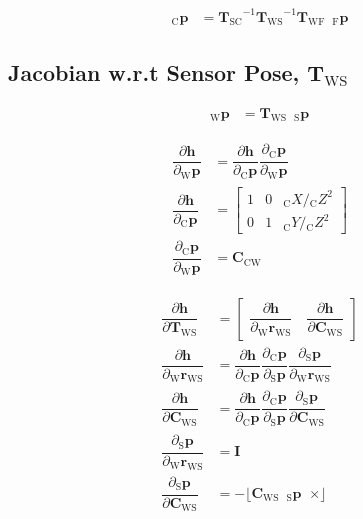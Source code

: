 \documentclass{article}
\renewcommand{\Vec}[1]{{\mathbf{#1}}}
\newcommand{\Mat}[1]{{\mathbf{#1}}}
\newcommand{\I}{{\Mat{I}}}
\newcommand{\Skew}[1]{{\lfloor #1 \enspace \times \rfloor}}
\newcommand{\tf}{\mathbf{T}}
\newcommand{\cam}{{\text{C}}}
\newcommand{\sensor}{{\text{S}}}
\newcommand{\world}{{\text{W}}}
\newcommand{\fiducial}{{\text{F}}}
\newcommand{\KineNotationTransform}[3]{{{#1}_{#2#3}}}
\newcommand{\KineNotation}[3]{{{{}_{#2}} {#1}_{#2#3}}}
\newcommand{\KineNotationPart}[3]{{{{}_{#2}} {#1}_{#3}}}
\newcommand{\KineNotationBare}[2]{{{{}_{#2}} {#1}}}
\newcommand{\pos}{{\Vec{r}}}
\newcommand{\Pos}[2]{{\KineNotation{\pos}{#1}{#2}}}
\newcommand{\rot}{{\Mat{C}}}
\newcommand{\Rot}[2]{{\KineNotationTransform{\rot}{#1}{#2}}}
\newcommand{\tf}{{\Mat{T}}}
\newcommand{\Tf}[2]{{\KineNotationTransform{\tf}{#1}{#2}}}
\newcommand{\point}{\Vec{p}}
\newcommand{\Pt}[1]{{\KineNotationPart{\point}{#1}{}}}
\newcommand{\Point}[2]{{\KineNotationBare{\point}{#1}}}
\newcommand{\projFunc}{{\Vec{h}}}
\begin{document}
\begin{align}
  \Point{\cam}{\fiducial_{ij}}
  &=
  \Tf{\sensor}{\cam}^{-1}
  \Tf{\world}{\sensor}^{-1}
  \Tf{\world}{\fiducial}
  \enspace \Point{\fiducial}{\fiducial_{ij}}
\end{align}


\subsection{Jacobian w.r.t Sensor Pose, $\Tf{\world}{\sensor}$}

\begin{align}
  \Point{\world}{\fiducial_{ij}}
  &=
    \Tf{\world}{\sensor}
    \enspace \Pt{\sensor}
\end{align}

\begin{align}
  \dfrac{\partial{\projFunc}}{\partial{\Pt{\world}}}
  &=
  \dfrac{\partial{\projFunc}}{\partial{\Pt{\cam}}}
  \dfrac{\partial{\Pt{\cam}}}{\partial{\Pt{\world}}} \\
  \dfrac{\partial{\projFunc}}{\partial{\Pt{\cam}}}
  &=
  \begin{bmatrix}
    1 & 0 & \KineNotationBare{X}{\cam} / \KineNotationBare{Z}{\cam}^{2} \\
    0 & 1 & \KineNotationBare{Y}{\cam} / \KineNotationBare{Z}{\cam}^{2}
  \end{bmatrix} \\
  \dfrac{\partial{\Pt{\cam}}}{\partial{\Pt{\world}}}
  &=
  \Rot{\cam}{\world}
\end{align}

\begin{align}
  \dfrac{\partial{\projFunc}}{\partial{\Tf{\world}{\sensor}}}
    &=
  \begin{bmatrix}
    \dfrac{\partial{\projFunc}}{\partial{\Pos{\world}{\sensor}}}
    \quad
    \dfrac{\partial{\projFunc}}{\partial{\Rot{\world}{\sensor}}}
  \end{bmatrix} \\
  \dfrac{\partial{\projFunc}}{\partial{\Pos{\world}{\sensor}}}
    &=
      \dfrac{\partial{\projFunc}}{\partial{\Pt{\cam}}}
      \dfrac{\partial{\Pt{\cam}}}{\partial{\Pt{\sensor}}}
      \dfrac{\partial{\Pt{\sensor}}}{\partial{\Pos{\world}{\sensor}}} \\
  \dfrac{\partial{\projFunc}}{\partial{\Rot{\world}{\sensor}}}
    &=
      \dfrac{\partial{\projFunc}}{\partial{\Pt{\cam}}}
      \dfrac{\partial{\Pt{\cam}}}{\partial{\Pt{\sensor}}}
      \dfrac{\partial{\Pt{\sensor}}}{\partial{\Rot{\world}{\sensor}}} \\
    \dfrac{\partial{\Pt{\sensor}}}{\partial{\Pos{\world}{\sensor}}}
    &=
      \I \\
    \dfrac{\partial{\Pt{\sensor}}}{\partial{\Rot{\world}{\sensor}}}
    &= -\Skew{\Rot{\world}{\sensor} \enspace \Pt{\sensor}}
\end{align}
\end{document}
